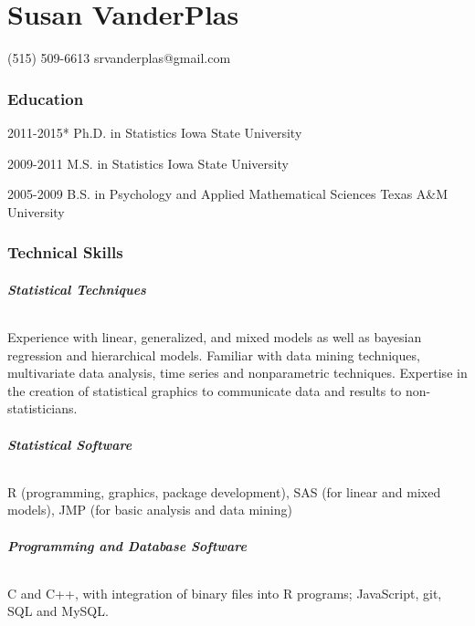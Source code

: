 \documentclass[10pt]{tccv}
\begin{document}
\part{Susan VanderPlas}


    {(515) 509-6613}
    {srvanderplas@gmail.com}
\section{Education}

\begin{yearlist}

\item{2011-2015*}
     {Ph.D. in Statistics}
     {Iowa State University}

\item{2009-2011}
     {M.S. in Statistics}
     {Iowa State University}

\item{2005-2009}
     {B.S. in Psychology and Applied Mathematical Sciences}
     {Texas A\&M University}

\end{yearlist}

\section{Technical Skills}
\paragraph{\textbf{Statistical Techniques}}
Experience with linear, generalized, and mixed models as well as bayesian regression and hierarchical models. Familiar with data mining techniques, multivariate data analysis, time series and nonparametric techniques. Expertise in the creation of statistical graphics to communicate data and results to non-statisticians.\vspace{-6pt}
\paragraph{\textbf{Statistical Software}}
R (programming, graphics, package development), SAS (for linear and mixed models), JMP (for basic analysis and data mining)\vspace{-6pt}
\paragraph{\textbf{Programming and Database Software}}
C and C++, with integration of binary files into R programs; JavaScript, git, SQL and MySQL.\vspace{-6pt}
\end{document}
